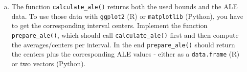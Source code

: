 {\begin{enumerate}[a)]
\begin{itemize}
\end{itemize}

\noindent Use \texttt{cumsum} in R or \texttt{np.cumsum} in Python to perform the aggregation step and therefore to get accumulated values for each interval value. 
Finally, if the \texttt{center} parameter is set, center each interval by subtracting the average of all interval values\\
\noindent \textit{Hint}: \texttt{mapply} in R or \texttt{zip(bounds, bounds[1:])} in Python are nice tricks to iterate over the lower and upper bounds at the same time.

\item The function \texttt{calculate\_ale()} returns both the used bounds and the ALE data. To use those data with
\texttt{ggplot2} (R) or \texttt{matplotlib} (Python), you have to get the corresponding interval centers. 
Implement the function \texttt{prepare\_ale()}, which should call \texttt{calculate\_ale()} first and then 
compute the averages/centers per interval. In the end \texttt{prepare\_ale()} should return 
the centers plus the corresponding ALE values - either as a \texttt{data.frame} (R) or 
two vectors (Python).
\end{enumerate}
}